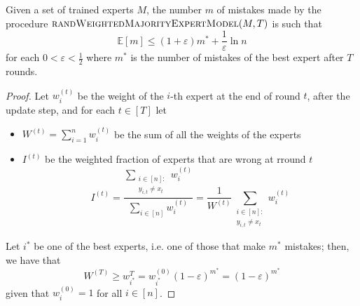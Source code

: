 \documentclass[a4paper, 12pt]{report}
\begin{document}
    \begin{framedthm}{}
        Given a set of trained experts $M$, the number $m$ of mistakes made by the procedure $\textsc{randWeightedMajorityExpertModel}(M, T)$ is such that $$\mathbb E [m] \le (1 + \varepsilon) m^* + \dfrac{1}{\varepsilon}\ln n$$ for each $0 < \varepsilon < \tfrac{1}{2}$ where $m^*$ is the number of mistakes of the best expert after $T$ rounds.
    \end{framedthm}

    \begin{proof}
        Let $w_i^{(t)}$ be the weight of the $i$-th expert at the end of round $t$, after the update step, and for each $t \in [T]$ let

        \begin{itemize}
            \item $W^{(t)} = \sum_{i = 1}^n{w_i^{(t)}}$ be the sum of all the weights of the experts
            \item $I^{(t)}$ be the weighted fraction of experts that are wrong at rround $t$ $$I^{(t)} = \dfrac{\sum_{\substack{i \in [n] : \\ y_{i, t} \neq x_t}}{w_i^{(t)}}}{\sum_{i \in [n]}{w_i^{(t)}}} = \dfrac{1}{W^{(t)}} \sum_{\substack{i \in [n] : \\ y_{i, t} \neq x_t}}{w_i^{(t)}}$$
        \end{itemize}

        Let $i^*$ be one of the best experts, i.e. one of those that make $m^*$ mistakes; then, we have that $$W^{(T)} \ge w_{i^*}^{T} = w_{i^*}^{(0)}(1 - \varepsilon)^{m^*} = (1 - \varepsilon)^{m^*}$$ given that $w_i^{(0)} = 1$ for all $i \in [n]$.



\end{proof}
\end{document}
